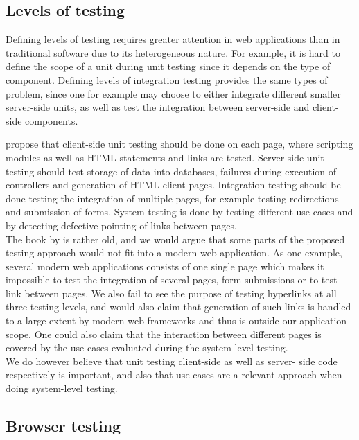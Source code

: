 \subsection{Levels of testing}

Defining levels of testing requires greater attention in web
applications than in traditional software due to its heterogeneous
nature. For example, it is hard to define the scope of a unit during
unit testing since it depends on the type of component. Defining levels
of integration testing provides the same types of problem, since one for
example may choose to either integrate different smaller server-side
units, as well as test the integration between server-side and client-
side components.\cite{book:web}

\citeauthor{book:web} propose that client-side unit testing should be
done on each page, where scripting modules as well as HTML statements
and links are tested. Server-side unit testing should test storage of
data into databases, failures during execution of controllers and
generation of HTML client pages. Integration testing should be done
testing the integration of multiple pages, for example testing
redirections and submission of forms. System testing is done by testing
different use cases and by detecting defective pointing of links between
pages.\\

The book by \citeauthor{book:web} is rather old, and we would argue that
some parts of the proposed testing approach would not fit into a modern
web application. As one example, several modern web applications
consists of one single page which makes it impossible to test the
integration of several pages, form submissions or to test link between
pages. We also fail to see the purpose of testing hyperlinks at all
three testing levels, and would also claim that generation of such links
is handled to a large extent by modern web frameworks and thus is
outside our application scope. One could also claim that the interaction
between different pages is covered by the use cases evaluated during
the system-level testing.\\

We do however believe that unit testing client-side as well as server-
side code respectively is important, and also that use-cases are a
relevant approach when doing system-level testing.\\


\subsection{Browser testing}

